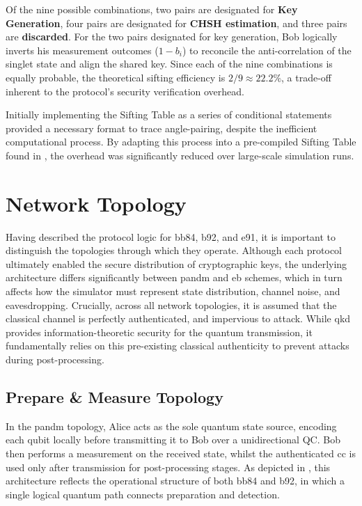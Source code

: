 Of the nine possible combinations, two pairs are designated for \textbf{Key Generation}, four pairs are designated for \textbf{CHSH estimation}, and three pairs are \textbf{discarded}. For the two pairs designated for key generation, Bob logically inverts his measurement outcomes ($1 - b_i$) to reconcile the anti-correlation of the singlet state and align the shared key. Since each of the nine combinations is equally probable, the theoretical sifting efficiency is $2/9 \approx 22.2\%$, a trade-off inherent to the protocol's security verification overhead.

Initially implementing the Sifting Table as a series of conditional statements provided a necessary format to trace angle-pairing, despite the inefficient computational process. By adapting this process into a pre-compiled Sifting Table found in , the overhead was significantly reduced over large-scale simulation runs. 


\newpage
\section{Network Topology}
\label{sec:networktopology}

Having described the protocol logic for \gls{bb84}, \gls{b92}, and \gls{e91}, it is important to distinguish the topologies through which they operate. Although each protocol ultimately enabled the secure distribution of cryptographic keys, the underlying architecture differs significantly between \gls{pandm} and \gls{eb} schemes, which in turn affects how the simulator must represent state distribution, channel noise, and eavesdropping. Crucially, across all network topologies, it is assumed that the classical channel is perfectly authenticated, and impervious to attack. While \gls{qkd} provides information-theoretic security for the quantum transmission, it fundamentally relies on this pre-existing classical authenticity to prevent attacks during post-processing.

\subsection{Prepare \& Measure Topology}
\label{subsec:pmtopology}
In the \gls{pandm} topology, Alice acts as the sole quantum state source, encoding each qubit locally before transmitting it to Bob over a unidirectional QC. Bob then performs a measurement on the received state, whilst the authenticated \gls{cc} is used only after transmission for post-processing stages. As depicted in , this architecture reflects the operational structure of both \gls{bb84} and \gls{b92}, in which a single logical quantum path connects preparation and detection.

